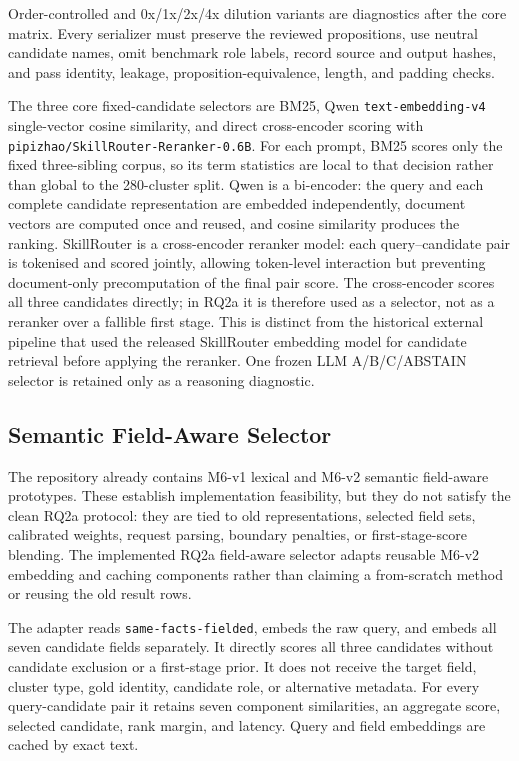 Order-controlled and 0x/1x/2x/4x dilution variants are diagnostics after the core matrix. Every serializer must preserve the reviewed propositions, use neutral candidate names, omit benchmark role labels, record source and output hashes, and pass identity, leakage, proposition-equivalence, length, and padding checks.

The three core fixed-candidate selectors are BM25, Qwen \texttt{text-embedding-v4} single-vector cosine similarity, and direct cross-encoder scoring with \texttt{pipizhao/SkillRouter-Reranker-0.6B}. For each prompt, BM25 scores only the fixed three-sibling corpus, so its term statistics are local to that decision rather than global to the 280-cluster split. Qwen is a bi-encoder: the query and each complete candidate representation are embedded independently, document vectors are computed once and reused, and cosine similarity produces the ranking. SkillRouter is a cross-encoder reranker model: each query--candidate pair is tokenised and scored jointly, allowing token-level interaction but preventing document-only precomputation of the final pair score. The cross-encoder scores all three candidates directly; in RQ2a it is therefore used as a selector, not as a reranker over a fallible first stage. This is distinct from the historical external pipeline that used the released SkillRouter embedding model for candidate retrieval before applying the reranker. One frozen LLM A/B/C/ABSTAIN selector is retained only as a reasoning diagnostic.

\subsection{Semantic Field-Aware Selector}

The repository already contains M6-v1 lexical and M6-v2 semantic field-aware prototypes. These establish implementation feasibility, but they do not satisfy the clean RQ2a protocol: they are tied to old representations, selected field sets, calibrated weights, request parsing, boundary penalties, or first-stage-score blending. The implemented RQ2a field-aware selector adapts reusable M6-v2 embedding and caching components rather than claiming a from-scratch method or reusing the old result rows.

The adapter reads \texttt{same-facts-fielded}, embeds the raw query, and embeds all seven candidate fields separately. It directly scores all three candidates without candidate exclusion or a first-stage prior. It does not receive the target field, cluster type, gold identity, candidate role, or alternative metadata. For every query-candidate pair it retains seven component similarities, an aggregate score, selected candidate, rank margin, and latency. Query and field embeddings are cached by exact text.

